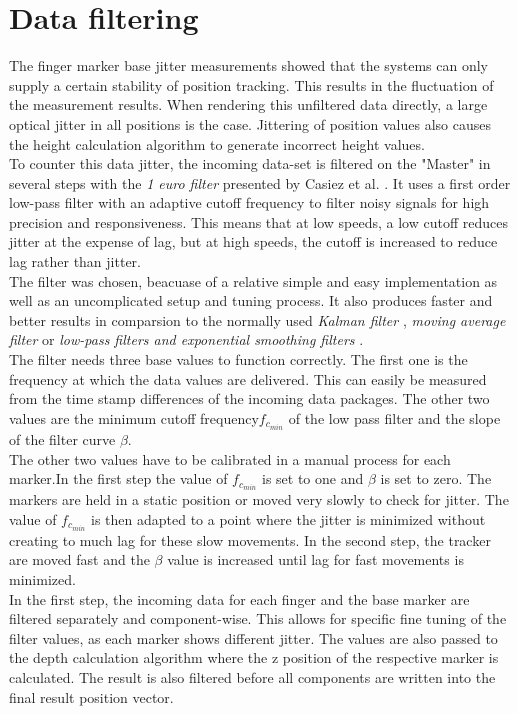\section{Data filtering}
The finger marker base jitter measurements showed that the systems can only supply a certain stability of position tracking. This results in the fluctuation of the measurement results. When rendering this unfiltered data directly, a large optical jitter in all positions is the case. Jittering of position values also causes the height calculation algorithm to generate incorrect height values.\\
To counter this data jitter, the incoming data-set is filtered on the "Master" in several steps with the \textit{1 euro filter} presented by Casiez et al. \cite{Casiez.2012}. It uses a first order low-pass filter with an adaptive cutoff frequency to filter noisy signals for high precision and responsiveness. This means that at low speeds, a low cutoff reduces jitter at the expense of lag, but at high speeds, the cutoff is increased to reduce lag rather than jitter.\\
The filter was chosen, beacuase of a relative simple and easy implementation as well as an uncomplicated setup and tuning process. It also produces faster and better results in comparsion to the normally used \textit{Kalman filter} \cite{Welch.2001}, \textit{moving average filter} or \textit{low-pass filters and exponential smoothing filters} \cite{LaViola.2003}.\\ The filter needs three base values to function correctly. The first one is the frequency at which the data values are delivered. This can easily be measured from the time stamp differences of the incoming data packages. The other two values are the minimum cutoff frequency$f_{c_{min}} $ of the low pass filter and the slope of the filter curve $\beta$.
\\The other two values have to be calibrated in a manual process for each marker.In the first step the value of $f_{c_{min}} $ is set to one and $\beta$ is set to zero. The markers are held in a static position or moved very slowly to check for jitter. The value of $f_{c_{min}} $ is then adapted to a point where the jitter is minimized without creating to much lag for these slow movements. In the second step, the tracker are moved fast and the $\beta$ value is increased until lag for fast movements is minimized.
\\ In the first step, the incoming data for each finger and the base marker are filtered separately and component-wise. This allows for specific fine tuning of the filter values, as each marker shows different jitter. The values are also passed to the depth calculation algorithm where the z position of the respective marker is calculated. The result is also filtered before all components are written into the final result position vector.
